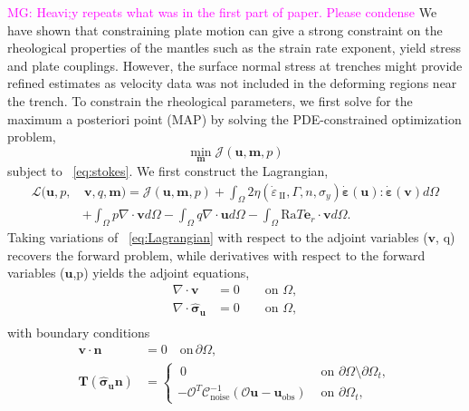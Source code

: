 \documentclass[12pt]{article}
\newcommand{\mgnote}[1]{\textcolor{magenta}{MG: #1}}
\newcommand{\IIinv}{{\dot\varepsilon}_{\mathrm{\!\!\:II}}}
\newcommand{\mm}{{\ensuremath{\boldsymbol{m}}}}
\newcommand{\uu}{{\ensuremath{\boldsymbol{u}}}}
\newcommand{\vv}{{\ensuremath{\boldsymbol{v}}}}
\newcommand{\ssigma}{{\ensuremath{\boldsymbol{\sigma}}}}
\newcommand{\strain}{{\ensuremath{\dot{\boldsymbol{\varepsilon}}}}}
\begin{document}
\mgnote{Heavi;y repeats what was in the first part of paper. Please condense} We have shown that constraining plate motion can give a strong constraint on the rheological properties of the mantles such as the strain rate exponent, yield stress and plate couplings. However, the surface normal stress at trenches might provide refined estimates as velocity data was not included in the deforming regions near the trench. To constrain the rheological parameters, we first
solve for the maximum a posteriori point (MAP) by solving the PDE-constrained optimization problem,
\begin{equation}
\underset{\mm}{\min} \mathcal{J}(\uu,\mm, p)
\end{equation}
subject to ~\eqref{eq:stokes}. We first construct the Lagrangian,
\begin{equation} \label{eq:Lagrangian}
\begin{split}
  \mathcal{L}(\uu,p,&\,\vv,q,\mm)=
  \mathcal{J}(\uu,\mm,p)+\!\!\int_{\Omega}
  \!2\eta(\IIinv,\Gamma, n, \sigma_y)\strain(\uu):\strain(\vv)d\Omega \\&
  +\int_{\Omega} p\nabla \cdot \vv d\Omega - \int_{\Omega} q \nabla \cdot
  \uu d\Omega -\int_{\Omega}\text{Ra}T \textbf{e}_r \cdot \vv d\Omega.
\end{split}
\end{equation}
Taking variations of ~\eqref{eq:Lagrangian} with respect to the adjoint variables (\vv, q) recovers the forward problem, while derivatives with respect to the forward variables (\uu,p) yields the adjoint equations,
\begin{equation}
  \label{eq:adjoint}
  \begin{split}
    \nabla \cdot \vv &=0 \qquad  \text{on } \Omega, \\
    \nabla \cdot \hat \ssigma_\uu&=0  \qquad \text{on } \Omega, \\
  \end{split}
\end{equation}
with boundary conditions 
\begin{align*}
  \vv\cdot \textbf{n}&=0 \quad \text{on} \, \partial \Omega, \\
  \textbf{T}(\hat\ssigma_\uu \textbf{n})
  &=\begin{cases} \:0 & \text{ on }\partial \Omega\setminus
  \partial\Omega_t, \\
  -\mathcal{O}^T\mathcal{C}^{-1}_{\text{noise}}(\mathcal O \uu-\uu_{\text{obs}}) &\text{ on }
  \partial\Omega_t,
  \end{cases}
  \label{eq:adjoint}
\end{align*}
\end{document}
